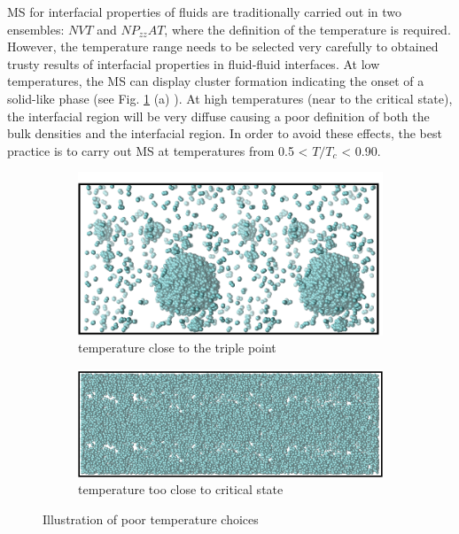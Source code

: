 \documentclass[9pt,bestpractices]{livecoms}
\begin{document}
MS for interfacial properties of fluids are traditionally carried out in two
ensembles: $NVT$ and $NP_{zz}AT$, where the definition
of the temperature is required. However, the temperature range needs to be
selected very carefully to obtained trusty results of interfacial properties in
fluid-fluid interfaces. At low temperatures, the MS can display
cluster formation indicating the onset of a solid-like phase (see Fig. \ref{fig:25} (a) ).
At high temperatures (near to the critical state), the interfacial region will
be very diffuse causing a poor definition of both the bulk densities and the
interfacial region. In order to avoid these effects, the best practice is to
carry out MS at temperatures from 0.5 {\textless} $T/T_{c}$
{\textless} 0.90.

\begin{figure}
	\begin{subfigure}{0.38\textwidth} %
    \includegraphics[width=1\textwidth]{gfx/image75.png}
    \caption{temperature close to the triple point}
	\end{subfigure}
	\begin{subfigure}{0.38\textwidth} %
    \includegraphics[width=1\textwidth]{gfx/image76.png}
    \caption{temperature too close to critical state}
	\end{subfigure}
\caption{Illustration of poor temperature choices}
\label{fig:25}
\end{figure}
\end{document}
